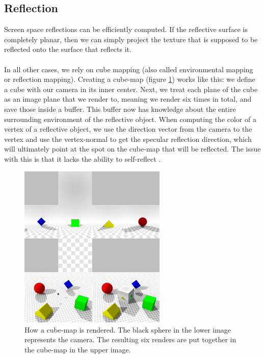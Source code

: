 \documentclass{ACGSeminar}
\begin{document}
	\subsection{Reflection}
		Screen space reflections can be efficiently computed. If the reflective surface is completely planar, then we can simply project the texture that is supposed to be reflected onto the surface that reflects it. \\\\
		In all other cases, we rely on cube mapping (also called environmental mapping or reflection mapping). Creating a cube-map (figure \ref{fig:cube_map}) works like this: we define a cube with our camera in its inner center. Next, we treat each plane of the cube as an image plane that we render to, meaning we render six times in total, and save those inside a buffer. This buffer now has knowledge about the entire surrounding environment of the reflective object. When computing the color of a vertex of a reflective object, we use the direction vector from the camera to the vertex and use the vertex-normal to get the specular reflection direction, which will ultimately point at the spot on the cube-map that will be reflected. The issue with this is that it lacks the ability to self-reflect \cite{REFL}.
		\begin{figure}[htb!]%
			\begin{center}%
				\includegraphics[width=7cm]{img/cube_map.png}
			\end{center}%
			\caption{How a cube-map is rendered. The black sphere in the lower image represents the camera. The resulting six renders are put together in the cube-map in the upper image.}%
			\label{fig:cube_map}%
		\end{figure}%
\end{document}
